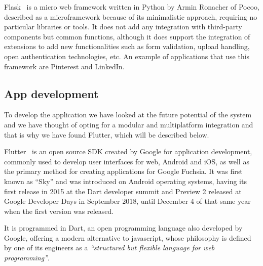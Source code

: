 Flask~\cite{Welcomet8:online} is a micro web framework written in Python by Armin Ronacher of Pocoo, described as a microframework because of its minimalistic approach, requiring no particular libraries or tools. It does not add any integration with third-party components but common functions, although it does support the integration of extensions to add new functionalities such as form validation, upload handling, open authentication technologies, etc. An example of applications that use this framework are Pinterest and LinkedIn.


\subsection{App development}
To develop the application we have looked at the future potential of the system and we have thought of opting for a modular and multiplatform integration and that is why we have found Flutter, which will be described below.

Flutter~\cite{FlutterB22:online} is an open source SDK created by Google for application development, commonly used to develop user interfaces for web, Android and iOS, as well as the primary method for creating applications for Google Fuchsia. It was first known as ``Sky'' and was introduced on Android operating systems, having its first release in 2015 at the Dart developer summit and Preview 2 released at Google Developer Days in September 2018, until December 4 of that same year when the first version was released.

It is programmed in Dart, an open programming language also developed by Google, offering a modern alternative to javascript, whose philosophy is defined by one of its engineers as a \textit{``structured but flexible language for web programming''}.




